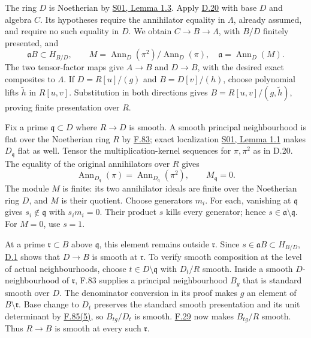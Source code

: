 \documentclass[11pt,a4paper,openany]{report}
\begin{document}
The ring \(D\) is Noetherian by \href{https://github.com/KokunoYumeto/open-math-courses/blob/main/docs/courses/AG-RG/AG-RG-S01.md}{S01, Lemma 1.3}. Apply \hyperref[AG-RG-S05-smoothing-lemma-desingularize]{D.20} with base \(D\) and algebra \(C\). Its hypotheses require the annihilator equality in \(\Lambda\), already assumed, and require no such equality in \(D\). We obtain \(C\to B\to\Lambda\), with \(B/D\) finitely presented, and \[
\mathfrak aB\subset H_{B/D},\qquad
M=\operatorname{Ann}_D(\pi^2)/\operatorname{Ann}_D(\pi),\quad
\mathfrak a=\operatorname{Ann}_D(M).
\] The two tensor-factor maps give \(A\to B\) and \(D\to B\), with the desired exact composites to \(\Lambda\). If \(D=R[u]/(g)\) and \(B=D[v]/(h)\), choose polynomial lifts \(\widetilde h\) in \(R[u,v]\). Substitution in both directions gives \(B=R[u,v]/(g,\widetilde h)\), proving finite presentation over \(R\).

Fix a prime \(\mathfrak q\subset D\) where \(R\to D\) is smooth. A smooth principal neighbourhood is flat over the Noetherian ring \(R\) by \hyperref[AG-RG-S05-algebra-lemma-smooth-syntomic]{F.83}; exact localization \href{https://github.com/KokunoYumeto/open-math-courses/blob/main/docs/courses/AG-RG/AG-RG-S01.md}{S01, Lemma 1.1} makes \(D_{\mathfrak q}\) flat as well. Tensor the multiplication-kernel sequences for \(\pi,\pi^2\) as in D.20. The equality of the original annihilators over \(R\) gives \[
\operatorname{Ann}_{D_{\mathfrak q}}(\pi)
=\operatorname{Ann}_{D_{\mathfrak q}}(\pi^2),\qquad M_{\mathfrak q}=0.
\] The module \(M\) is finite: its two annihilator ideals are finite over the Noetherian ring \(D\), and \(M\) is their quotient. Choose generators \(m_i\). For each, vanishing at \(\mathfrak q\) gives \(s_i\notin\mathfrak q\) with \(s_im_i=0\). Their product \(s\) kills every generator; hence \(s\in\mathfrak a\setminus\mathfrak q\). For \(M=0\), use \(s=1\).

At a prime \(\mathfrak r\subset B\) above \(\mathfrak q\), this element remains outside \(\mathfrak r\). Since \(s\in\mathfrak aB\subset H_{B/D}\), \hyperref[AG-RG-S05-smoothing-definition-singular-ideal]{D.1} shows that \(D\to B\) is smooth at \(\mathfrak r\). To verify smooth composition at the level of actual neighbourhoods, choose \(t\in D\setminus\mathfrak q\) with \(D_t/R\) smooth. Inside a smooth \(D\)-neighbourhood of \(\mathfrak r\), F.83 supplies a principal neighbourhood \(B_g\) that is standard smooth over \(D\). The denominator conversion in its proof makes \(g\) an element of \(B\setminus\mathfrak r\). Base change to \(D_t\) preserves the standard smooth presentation and its unit determinant by \hyperref[AG-RG-S05-algebra-lemma-standard-smooth]{F.85(5)}, so \(B_{tg}/D_t\) is smooth. \hyperref[AG-RG-S05-algebra-lemma-compose-smooth]{F.29} now makes \(B_{tg}/R\) smooth. Thus \(R\to B\) is smooth at every such \(\mathfrak r\).
\end{document}
